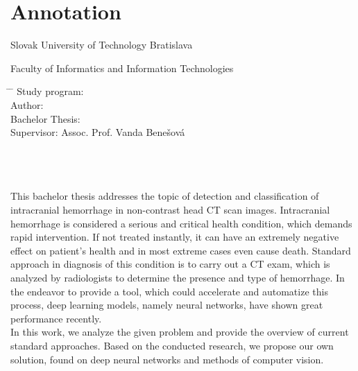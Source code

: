 
\thispagestyle{empty}




\newpage
\thispagestyle{empty}
\mbox{}
\newpage

\thispagestyle{empty}

\section*{Annotation}

\begin{minipage}[t]{1\columnwidth}%

Slovak University of Technology Bratislava 

Faculty of Informatics and Information Technologies



\begin{tabbing}
\hspace{1.5in}     \= \hspace{1in}  \= \hspace{1in}    \kill
Study program:       \> \myStudyProgramENG       \\ 
Author:     \> \myName                  \\
Bachelor Thesis: \> \tabfill{\myTitleENG}   \\
Supervisor:     \> Assoc. Prof. Vanda Benešová  
\end{tabbing}

\myDateENG
\end{minipage}
\\
\\
\\ 
This bachelor thesis addresses the topic of detection and classification of intracranial hemorrhage in non-contrast head CT scan images. Intracranial hemorrhage is considered a serious and critical health condition, which demands rapid intervention. If not treated instantly, it can have an extremely negative effect on patient's health and in most extreme cases even cause death. Standard approach in diagnosis of this condition is to carry out a CT exam, which is analyzed by radiologists to determine the presence and type of hemorrhage. In the endeavor to provide a tool, which could accelerate and automatize this process, deep learning models, namely neural networks, have shown great performance recently.
\\
In this work, we analyze the given problem and provide the overview of current standard approaches. Based on the conducted research, we propose our own solution, found on deep neural networks and methods of computer vision.



